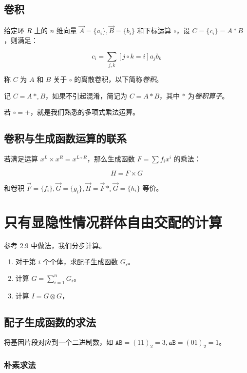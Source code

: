 \documentclass{article}
\begin{document}
\subsection{卷积}

给定环 $R$ 上的 $n$ 维向量 $\vec A=\{a_i\},\vec B=\{b_i\}$ 和下标运算 $\circ$，设 $C=\{c_i\}=A*B$，则满足：

\begin{equation*}
    c_i=\sum_{j,k} [j \circ k=i] a_jb_k
\end{equation*}

称 $C$ 为 $A$ 和 $B$ 关于 $\circ$ 的离散卷积，以下简称\textsl{卷积}。

记 $C=A*_{\circ}B$，如果不引起混淆，简记为 $C=A*B$，其中 $*$ 为\textsl{卷积算子}。

若 $\circ = +$，就是我们熟悉的多项式乘法运算。

\subsection{卷积与生成函数运算的联系}

若满足运算 $x^L \times x^R = x^{L \circ R}$，那么生成函数 $F=\sum f_i x^i$ 的乘法：

$$H=F \times G$$

和卷积 $\vec F=\{f_i\},\vec G=\{g_i\},\vec H=\vec F *_{\circ} \vec G=\{h_i\}$ 等价。

\section{只有显隐性情况群体自由交配的计算}

参考 2.9 中做法，我们分步计算。

\begin{enumerate}
    \item 对于第 $i$ 个个体，求配子生成函数 $G_i$。
    \item 计算 $G=\sum_{i=1}^n G_i$。 
    \item 计算 $I=G \otimes G$，
\end{enumerate}

\subsection{配子生成函数的求法}

将基因片段对应到一个二进制数，如 $\texttt{AB}=(11)_2=3,\texttt{aB}=(01)_2=1$。

\subsubsection*{朴素求法}
\end{document}
